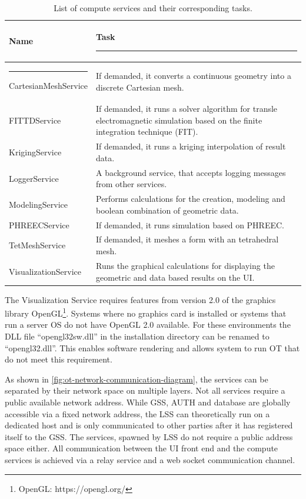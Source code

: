 \begin{table}[h!]
	\centering
	\begin{tabular}{|l | p{}|} 
		\hline
		\bfseries Name & \bfseries Task  \rule{-5pt}{2.6ex} \\
		\hline \rule{-3pt}{3ex}
		CartesianMeshService & If demanded, it converts a continuous geometry into a discrete Cartesian mesh. \\
		FITTDService & If demanded, it runs a solver algorithm for transle electromagnetic simulation based on the finite integration technique (FIT).\\
		KrigingService & If demanded, it runs a kriging interpolation of result data. \\ 
		LoggerService & A background service, that accepts logging messages from other services. \\ 
		ModelingService & Performs calculations for the creation, modeling and boolean combination of geometric data. \\ 
		PHREECService & If demanded, it runs simulation based on PHREEC. \\ 
		TetMeshService & If demanded, it meshes a form with an tetrahedral mesh.  \\ 
		VisualizationService & Runs the graphical calculations for displaying the geometric and data based results on the \ac{UI}.\\ 
		[1ex] 
		\hline
	\end{tabular}
	\caption{List of compute services and their corresponding tasks.}
	\label{tbl:ot-compute-services}
\end{table}

The Visualization Service requires features from version 2.0 of the graphics library OpenGL\footnote{OpenGL: https://opengl.org/}. Systems where no graphics card is installed or systems that run a server \ac{OS} do not have OpenGL 2.0 available. For these environments the \ac{DLL} file \enquote{opengl32sw.dll} in the installation directory can be renamed to \enquote{opengl32.dll}. This enables software rendering and allows system to run \ac{OT} that do not meet this requirement.

As shown in \autoref{fig:ot-network-communication-diagram}, the services can be separated by their network space on multiple layers. Not all services require a public available network address.
While \ac{GSS}, \ac{AUTH} and database are globally accessible via a fixed network address, the \ac{LSS} can theoretically run on a dedicated host and is only communicated to other parties after it has registered itself to the \ac{GSS}. The services, spawned by \ac{LSS} do not require a public address space either. All communication between the \ac{UI} front end and the compute services is achieved via a relay service and a web socket communication channel.


